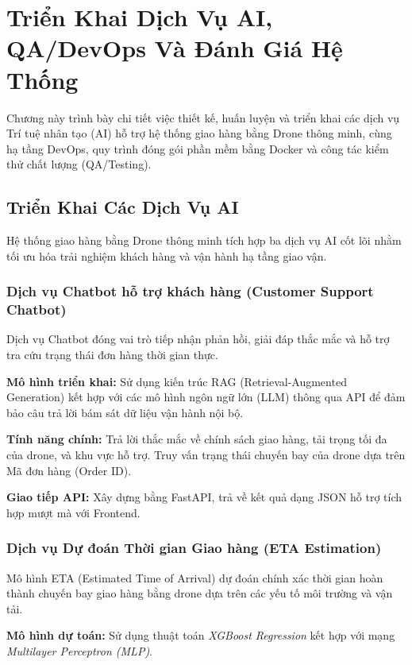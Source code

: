 \setcounter{chapter}{4} %

\chapter{Triển Khai Dịch Vụ AI, QA/DevOps Và Đánh Giá Hệ Thống}
\label{chuong:5}

Chương này trình bày chi tiết việc thiết kế, huấn luyện và triển khai các dịch vụ Trí tuệ nhân tạo (AI) hỗ trợ hệ thống giao hàng bằng Drone thông minh, cùng hạ tầng DevOps, quy trình đóng gói phần mềm bằng Docker và công tác kiểm thử chất lượng (QA/Testing).

\section{Triển Khai Các Dịch Vụ AI}

Hệ thống giao hàng bằng Drone thông minh tích hợp ba dịch vụ AI cốt lõi nhằm tối ưu hóa trải nghiệm khách hàng và vận hành hạ tầng giao vận.

\subsection{Dịch vụ Chatbot hỗ trợ khách hàng (Customer Support Chatbot)}
Dịch vụ Chatbot đóng vai trò tiếp nhận phản hồi, giải đáp thắc mắc và hỗ trợ tra cứu trạng thái đơn hàng thời gian thực.

\textbf{Mô hình triển khai:} Sử dụng kiến trúc RAG (Retrieval-Augmented Generation) kết hợp với các mô hình ngôn ngữ lớn (LLM) thông qua API để đảm bảo câu trả lời bám sát dữ liệu vận hành nội bộ.

\textbf{Tính năng chính:}
Trả lời thắc mắc về chính sách giao hàng, tải trọng tối đa của drone, và khu vực hỗ trợ.
Truy vấn trạng thái chuyến bay của drone dựa trên Mã đơn hàng (Order ID).

\textbf{Giao tiếp API:} Xây dựng bằng FastAPI, trả về kết quả dạng JSON hỗ trợ tích hợp mượt mà với Frontend.

\subsection{Dịch vụ Dự đoán Thời gian Giao hàng (ETA Estimation)}
Mô hình ETA (Estimated Time of Arrival) dự đoán chính xác thời gian hoàn thành chuyến bay giao hàng bằng drone dựa trên các yếu tố môi trường và vận tải.

\textbf{Mô hình dự toán:} Sử dụng thuật toán \textit{XGBoost Regression} kết hợp với mạng \textit{Multilayer Perceptron (MLP)}.

